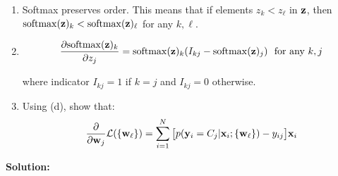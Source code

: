 \documentclass[12pt,letterpaper]{article}
\begin{document}
\begin{enumerate}
{{\begin{enumerate}
      \item Softmax preserves order. This means that if elements $z_k < z_\ell$
    in $\mathbf{z}$, then  $\mathrm{softmax}(\mathbf{z})_k < \mathrm{softmax}(\mathbf{z})_{\ell}$ for any $k,\ell$. 
      \item \[\frac{\partial \mathrm{softmax}(\mathbf{z})_k }{\partial z_j} = \mathrm{softmax}(\mathbf{z})_k (I_{kj} - \mathrm{softmax}(\mathbf{z})_j) \ \ \text{for\ any\ } k, j  \]

    where indicator $I_{kj}=1$ if $k=j$ and $I_{kj}=0$ otherwise.

    \item Using (d), show that:
       \[ \frac{\partial }{\partial \mathbf{w}_j} \mathcal{L}(\{\mathbf{w}_{\ell}\}) = \sum_{i=1}^N 
       \big[p(\mathbf{y}_i = C_j | \mathbf{x}_i; \{\mathbf{w}_\ell\}) - y_{ij} \big] \mathbf{x}_i  \]
    
  \end{enumerate}
}}

  \newpage

  \textbf{Solution:}
            
  
  \end{enumerate}
\end{document}
